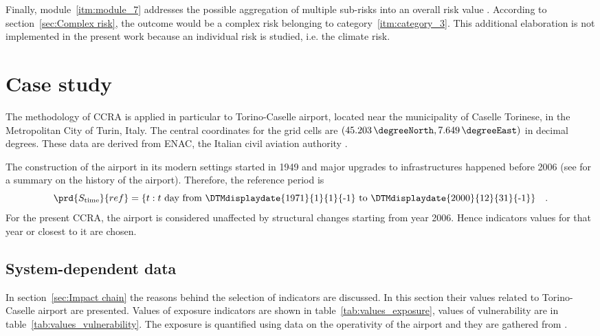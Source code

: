 Finally, module~\ref{itm:module_7} addresses the possible aggregation of multiple sub-risks into an overall \gls{risk} value \cite[54]{2017GIZRiskSupplement}. According to section~\ref{sec:Complex risk}, the outcome would be a complex risk belonging to category~\ref{itm:category_3}.
This additional elaboration is not implemented in the present work because an individual \gls{risk} is studied, i.e. the climate risk.



\section{Case study}
The methodology of \gls{CCRA} is applied in particular to Torino-Caselle airport, located near the municipality of Caselle Torinese, in the Metropolitan City of Turin, Italy.
The central coordinates for the grid cells are $(\qty{45.203}{\degreeNorth}, \qty{7.649}{\degreeEast})$ in decimal degrees. These data are derived from \gls{ENAC}, the Italian civil aviation authority \cite{2014ENACTorinoCaselle}.

The construction of the airport in its modern settings started in 1949 and major upgrades to infrastructures happened before 2006 (see \cite[18]{2015PudduCorporateSocial} for a summary on the history of the airport). Therefore, the reference period is
\begin{equation}
  \label{eq:period_reference_torino}
  \prd{S_\text{time}}{ref} = \{ t : \text{$t$ day from \DTMdisplaydate{1971}{1}{1}{-1} to \DTMdisplaydate{2000}{12}{31}{-1}} \}
  \quad .
\end{equation}
For the present \gls{CCRA}, the airport is considered unaffected by structural changes starting from year 2006. Hence \glspl{indicator} values for that year or closest to it are chosen.



\subsection{System-dependent data}
In section~\ref{sec:Impact chain} the reasons behind the selection of \glspl{indicator} are discussed. In this section their values related to Torino-Caselle airport are presented. Values of \gls{exposure} indicators are shown in table~\ref{tab:values_exposure}, values of \gls{vulnerability} are in table~\ref{tab:values_vulnerability}.
The exposure is quantified using data on the operativity of the airport and they are gathered from \cite[154-179]{2010OneWorksAtlanteDegli}.

